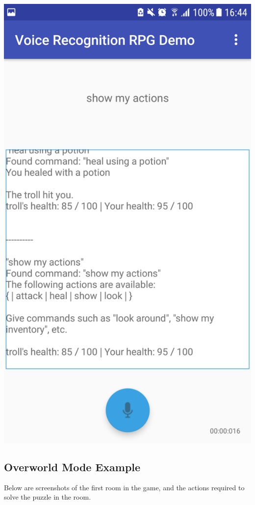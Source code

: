 \documentclass[11pt]{article}
\begin{document}
\begin{appendices}
\begin{center}
\includegraphics[scale=0.18]{battle-4.png}
\end{center}

\newpage
\subsection{Overworld Mode Example}
\label{appendix:overworld-mode-screenshots}
Below are screenshots of the first room in the game, and the actions required to solve the puzzle in the room.


\end{appendices}
\end{document}

